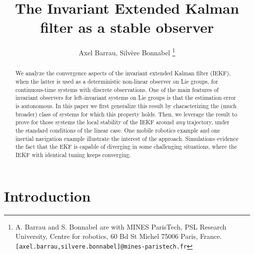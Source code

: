\documentclass[a4paper,12pt,onecolumn]{article}
\begin{document}
\title{The Invariant Extended Kalman filter as a stable observer}
\author{Axel Barrau, Silv\` ere Bonnabel
\thanks{A. Barrau and S. Bonnabel are with MINES
ParisTech, PSL Research University, Centre for
robotics, 60 Bd St Michel 75006 Paris, France.{\tt\small [axel.barrau,silvere.bonnabel]@mines-paristech.fr}} }
\date{}

\maketitle

\thispagestyle{empty}

\pagestyle{empty}

\begin{abstract}
 We analyze the convergence aspects of the invariant extended Kalman filter (IEKF), when the latter is used as a deterministic non-linear observer on Lie groups, for continuous-time systems with discrete observations. One of the main features of invariant observers for left-invariant systems on Lie groups is that the estimation error is autonomous. In this paper we first generalize this result by characterizing the (much broader) class of systems  for which this property holds. Then, we leverage the result to prove for those systems the local stability of the IEKF around \emph{any} trajectory, under the standard conditions of the linear case. One mobile robotics example and one inertial navigation example illustrate the interest of the approach. Simulations evidence the fact that the EKF is capable of diverging in some challenging situations, where the IEKF with identical tuning keeps converging. 
\end{abstract}















\section{Introduction}
\end{document}
